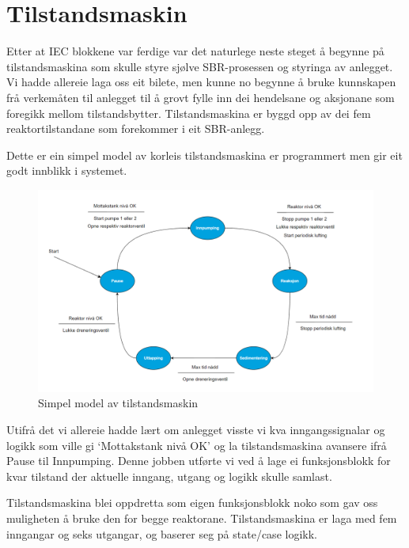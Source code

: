 \section{Tilstandsmaskin}
\thispagestyle{fancy}

Etter at IEC blokkene var ferdige var det naturlege neste steget å begynne på tilstandsmaskina som skulle styre sjølve SBR-prosessen
og styringa av anlegget. Vi hadde allereie laga oss eit bilete, men kunne no begynne å bruke kunnskapen frå verkemåten til anlegget
til å grovt fylle inn dei hendelsane og aksjonane som foregikk mellom tilstandsbytter. 
Tilstandsmaskina er byggd opp av dei fem reaktortilstandane som forekommer i eit SBR-anlegg.

Dette er ein simpel model av korleis tilstandsmaskina er programmert men gir eit godt innblikk i systemet.

\begin{figure}[htbp]
    \centering
    \includegraphics[width=1\textwidth]{Figurar/Simpel tilstandsmaskin.png}
    \caption{Simpel model av tilstandsmaskin}\label{fig:reaktorsoner}
\end{figure}

Utifrå det vi allereie hadde lært om anlegget visste vi kva inngangssignalar og logikk som ville gi
`Mottakstank nivå OK' og la tilstandsmaskina avansere ifrå Pause til Innpumping. Denne jobben utførte vi ved å lage ei
funksjonsblokk for kvar tilstand der aktuelle inngang, utgang og logikk skulle samlast.

\newpage

Tilstandsmaskina blei oppdretta som eigen funksjonsblokk noko som gav oss muligheten å bruke den for begge reaktorane.
Tilstandsmaskina er laga med fem inngangar og seks utgangar, og baserer seg på state/case logikk.

